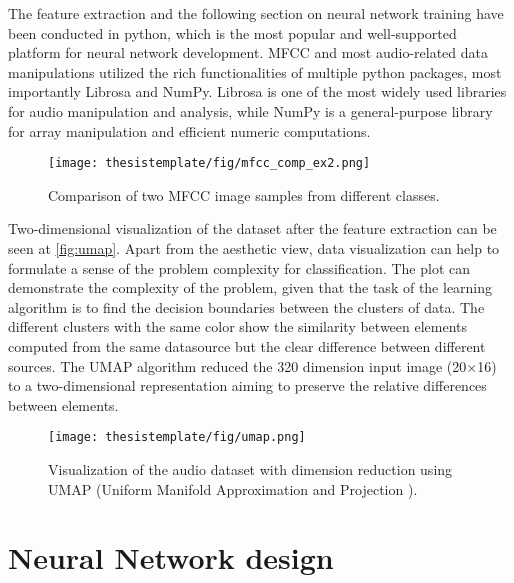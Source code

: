 The feature extraction and the following section on neural network training have been conducted in python, which is the most popular and well-supported platform for neural network development. MFCC and most audio-related data manipulations utilized the rich functionalities of multiple python packages, most importantly Librosa and NumPy. Librosa \cite{librosa} is one of the most widely used libraries for audio manipulation and analysis, while NumPy \cite{harris2020NumPy} is a general-purpose library for array manipulation and efficient numeric computations.



\begin{figure}[ht!]
  \begin{center}
    \texttt{[image: thesistemplate/fig/mfcc\_comp\_ex2.png]}
    \caption{Comparison of two MFCC image samples from different classes.}
    \label{fig:mfcc_img_comp}
  \end{center}
\end{figure}

Two-dimensional visualization of the dataset after the feature extraction can be seen at \autoref{fig:umap}. Apart from the aesthetic view, data visualization can help to formulate a sense of the problem complexity for classification. The plot can demonstrate the complexity of the problem, given that the task of the learning algorithm is to find the decision boundaries between the clusters of data. The different clusters with the same color show the similarity between elements computed from the same datasource but the clear difference between different sources. The UMAP algorithm \cite{2018arXivUMAP} reduced the 320 dimension input image (20$\times$16) to a two-dimensional representation aiming to preserve the relative differences between elements.



\begin{figure}[ht]
  \begin{center}
    \texttt{[image: thesistemplate/fig/umap.png]}
    \caption{Visualization of the audio dataset with dimension reduction using UMAP (Uniform Manifold Approximation and Projection \cite{2018arXivUMAP}).  }
    \label{fig:umap}
  \end{center}
\end{figure}


\section{Neural Network design}

